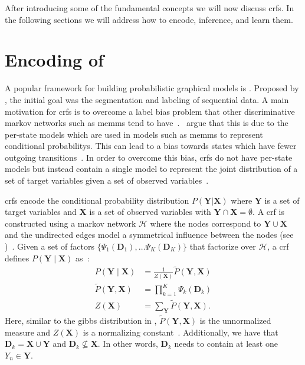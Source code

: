 \bigskip

After introducing some of the fundamental concepts we will now discuss \glspl{crf}. In the following sections we will address how to encode, inference, and learn them.

\section{Encoding of }\label{sec:definition-crfs}
A popular framework for building \glspl{probabilistic graphical model} is .
Proposed by \citet{lafferty2001conditional}, the initial goal was the segmentation and labeling of sequential data.
A main motivation for \glspl{crf} is to overcome a label bias problem that other discriminative \glspl{markov network} such as \glspl{memm} tend to have~\citep{lafferty2001conditional}.\
\citet{lafferty2001conditional} argue that this is due to the per-state models which are used in models such as \glspl{memm} to represent \glspl{conditional probability}.
This can lead to a bias towards states which have fewer outgoing transitions~\citep{lafferty2001conditional}.
In order to overcome this bias, \glspl{crf} do not have per-state models but instead contain a single model to represent the \gls{joint distribution} of a set of \glspl{target variable} given a set of \glspl{observed variable}~\citep{lafferty2001conditional}.

\bigskip

\Glspl{crf} encode the \gls{conditional probability distribution} $P(\mathbf{Y}|\mathbf{X})$ where $\mathbf{Y}$ is a set of \glspl{target variable} and $\mathbf{X}$ is a set of \glspl{observed variable} with $\mathbf{Y}\cap\mathbf{X}=\emptyset$.
A \gls{crf} is constructed using a \gls{markov network} $\mathcal{H}$ where the nodes correspond to $\mathbf{Y}\cup\mathbf{X}$ and the undirected edges model a symmetrical influence between the nodes (see \Cref{subsec:graphical-models})~\citep{koller2009probabilistic}.
Given a set of \glspl{factor} $\{\Psi_1(\mathbf{D}_1),\dots\Psi_K(\mathbf{D}_K)\}$ that factorize over $\mathcal{H}$, a \gls{crf} defines $P(\mathbf{Y}\mid\mathbf{X})$ as~\citep{koller2009probabilistic}:
\begin{equation}
  \label{equ:crf-factor}
  \begin{split}
    P(\mathbf{Y}\mid\mathbf{X}) & = \frac{1}{Z(\mathbf{X})}\tilde{P}(\mathbf{Y},\mathbf{X}) \\
    \tilde{P}(\mathbf{Y},\mathbf{X}) &= \prod_{k=1}^{K}\Psi_k\left(\mathbf{D}_k\right) \\
    Z(\mathbf{X}) & = \sum_{\mathbf{Y}}\tilde{P}(\mathbf{Y},\mathbf{X}).
  \end{split}
\end{equation}
Here, similar to the \gls{gibbs distribution} in , $\tilde{P}(\mathbf{Y},\mathbf{X})$ is the unnormalized measure and $Z(\mathbf{X})$ is a normalizing constant~\citep{koller2009probabilistic}.
Additionally, we have that $\mathbf{D}_k=\mathbf{X}\cup\mathbf{Y}$ and $\mathbf{D}_k\not\subseteq\mathbf{X}$.
In other words, $\mathbf{D}_k$ needs to contain at least one $Y_n\in \mathbf{Y}$.

